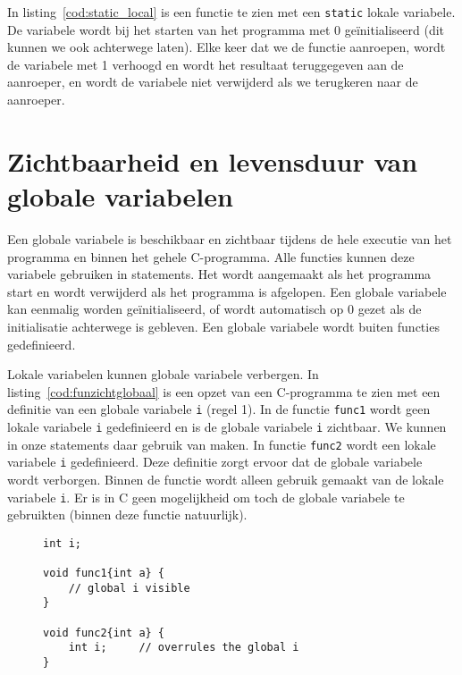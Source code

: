 In listing~\ref{cod:static_local} is een functie te zien met een \texttt{static} lokale variabele. De variabele wordt bij het starten van het programma met 0 geïnitialiseerd (dit kunnen we ook achterwege laten).
Elke keer dat we de functie aanroepen, wordt de variabele met 1 verhoogd en wordt het resultaat teruggegeven aan de aanroeper, en wordt de variabele niet verwijderd als we terugkeren naar de aanroeper.



\section{Zichtbaarheid en levensduur van globale variabelen}
Een globale variabele is beschikbaar en zichtbaar tijdens de hele executie van het programma en binnen het gehele C-programma. Alle functies kunnen deze variabele gebruiken in statements. Het wordt aangemaakt als het programma start en wordt verwijderd als het programma is afgelopen. Een globale variabele kan eenmalig worden geïnitialiseerd, of wordt automatisch op 0 gezet als de initialisatie achterwege is gebleven. Een globale variabele wordt buiten functies gedefinieerd.

Lokale variabelen kunnen globale variabele verbergen. In listing~\ref{cod:funzichtglobaal} is een opzet van een C-programma te zien met een definitie van een globale variabele \texttt{i} (regel 1). In de functie \texttt{func1} wordt geen lokale variabele \texttt{i} gedefinieerd en is de globale variabele \texttt{i} zichtbaar. We kunnen in onze statements daar gebruik van maken. In functie \texttt{func2} wordt een lokale variabele \texttt{i} gedefinieerd. Deze definitie zorgt ervoor dat de globale variabele wordt verborgen. Binnen de functie wordt alleen gebruik gemaakt van de lokale variabele \texttt{i}. Er is in C geen mogelijkheid om toch de globale variabele te gebruikten (binnen deze functie natuurlijk).

\begin{figure}[!ht]
\begin{lstlisting}[caption=Zichtbaarheid van globale variabelen.,label=cod:funzichtglobaal]
int i;

void func1{int a} {
    // global i visible
}

void func2{int a} {
    int i;     // overrules the global i
}
\end{lstlisting}
\end{figure}

